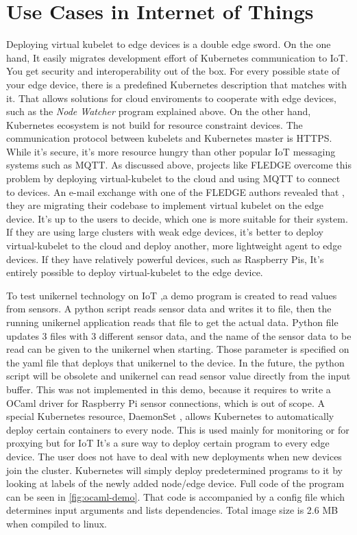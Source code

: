 \section{Use Cases in Internet of Things}

Deploying virtual kubelet to edge devices is a double edge sword. On the one hand, It easily migrates development effort of Kubernetes communication to IoT. You get security and interoperability out of the box. For every possible state of your edge device, there is a predefined Kubernetes description that matches with it. That allows solutions for cloud enviroments to cooperate with edge devices, such as the \textit{Node Watcher} program explained above. On the other hand, Kubernetes ecosystem is not build for resource constraint devices. The communication protocol between kubelets and Kubernetes master is HTTPS. While it's secure, it's more resource hungry than other popular IoT messaging systems such as MQTT. As discussed above, projects like FLEDGE overcome this problem by deploying virtual-kubelet to the cloud and using MQTT to connect to devices. An e-mail exchange with one of the FLEDGE authors revealed that , they are migrating their codebase to implement virtual kubelet on the edge device. It's up to the users to decide, which one is more suitable for their system. If they are using large clusters with weak edge devices, it's better to deploy virtual-kubelet to the cloud and deploy another, more lightweight agent to edge devices. If they have relatively powerful devices, such as Raspberry Pis, It's entirely possible to deploy virtual-kubelet to the edge device.

To test unikernel technology on IoT ,a demo program is created to read values from sensors. A python script reads sensor data and writes it to file, then the running unikernel application reads that file to get the actual data. Python file updates 3 files with 3 different sensor data, and the name of the sensor data to be read can be given to the unikernel when starting. Those parameter is specified on the yaml file that deploys that unikernel to the device. In the future, the python script will be obsolete and unikernel can read sensor value directly from the input buffer. This was not implemented in this demo, because it requires to write a OCaml driver for Raspberry Pi sensor connections, which is out of scope. A special Kubernetes resource, DaemonSet , allows Kubernetes to automatically deploy certain containers to every node. This is used mainly for monitoring or for proxying but for IoT It's a sure way to deploy certain program to every edge device. The user does not have to deal with new deployments when new devices join the cluster. Kubernetes will simply deploy predetermined programs to it by looking at labels of the newly added node/edge device. Full code of the program can be seen in \ref{fig:ocaml-demo}. That code is accompanied by a config file which determines input arguments and lists dependencies. Total image size is 2.6 MB when compiled to linux.

